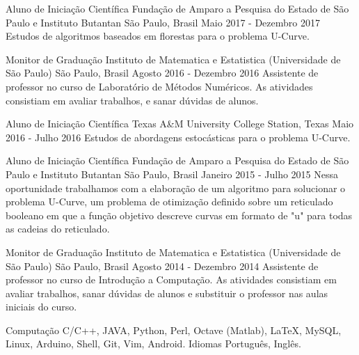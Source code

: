 \documentclass[11pt, a4paper]{awesome-cv-res}
\begin{document}
\begin{cventries}
\cventry
{Aluno de Iniciação Científica}
{Fundação de Amparo a Pesquisa do Estado de São Paulo e Instituto Butantan}
{São Paulo, Brasil}
{Maio 2017 - Dezembro 2017}
{Estudos de algoritmos baseados em florestas para o problema U-Curve.}
\newline 
\newline

\cventry
{Monitor de Graduação}
{Instituto de Matematica e Estatistica (Universidade de São Paulo)} 
{São Paulo, Brasil}
{Agosto 2016 - Dezembro 2016}
{Assistente de professor no curso de Laboratório de Métodos Numéricos. As atividades consistiam em avaliar trabalhos, e sanar dúvidas de alunos.}
\newline 
\newline

\cventry
{Aluno de Iniciação Científica}
{Texas A\&M University}
{College Station, Texas}
{Maio 2016 - Julho 2016}
{Estudos de abordagens estocásticas para o problema U-Curve.}
\newline 
\newline

\cventry
{Aluno de Iniciação Científica}
{Fundação de Amparo a Pesquisa do Estado de São Paulo e Instituto Butantan}
{São Paulo, Brasil}
{Janeiro 2015 - Julho 2015}
{Nessa oportunidade trabalhamos com a elaboração de um algoritmo para solucionar o problema U-Curve, um problema de otimização definido sobre um reticulado booleano em que a função objetivo descreve curvas em formato de "u" para todas as cadeias do reticulado.}
\newline 
\newline

\cventry
{Monitor de Graduação} 
{Instituto de Matematica e Estatistica (Universidade de São Paulo)} 
{São Paulo, Brasil}
{Agosto 2014 - Dezembro 2014}
{Assistente de professor no curso de Introdução a Computação. As atividades consistiam em avaliar trabalhos, sanar dúvidas de alunos e substituir o professor nas aulas iniciais do curso.}
\end{cventries}

\begin{cvskills}
\cvskill
{Computação} %
{C/C++, JAVA, Python, Perl, Octave (Matlab), LaTeX, MySQL, Linux, 
Arduino, Shell, Git, Vim, Android.} %
\cvskill
{Idiomas} %
{Português, Inglês.} %

\end{cvskills}
\end{document}
